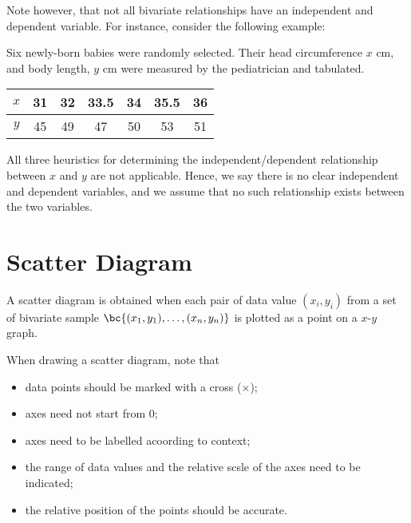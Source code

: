 Note however, that not all bivariate relationships have an independent and dependent variable. For instance, consider the following example:

\begin{example}
    Six newly-born babies were randomly selected. Their head circumference $x$ cm, and body length, $y$ cm were measured by the pediatrician and tabulated.

    \begin{table}[H]
        \centering
        \begin{tabular}{|c|c|c|c|c|c|c|}
        \hline
        $x$ & 31 & 32 & 33.5 & 34 & 35.5 & 36 \\ \hline
        $y$ & 45 & 49 & 47 & 50 & 53 & 51 \\ \hline
        \end{tabular}
    \end{table}

    All three heuristics for determining the independent/dependent relationship between $x$ and $y$ are not applicable. Hence, we say there is no clear independent and dependent variables, and we assume that no such relationship exists between the two variables.
\end{example}

\section{Scatter Diagram}

A scatter diagram is obtained when each pair of data value $(x_i, y_i)$ from a set of bivariate sample $\bc{(x_1, y_1), \dots, (x_n, y_n)}$ is plotted as a point on a $x$-$y$ graph.

\begin{recipe}
    When drawing a scatter diagram, note that
    \begin{itemize}
        \item data points should be marked with a cross ($\times$);
        \item axes need not start from 0;
        \item axes need to be labelled acoording to context;
        \item the range of data values and the relative scsle of the axes need to be indicated;
        \item the relative position of the points should be accurate.
    \end{itemize}
\end{recipe}

